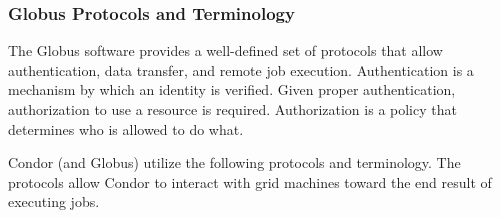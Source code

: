 \subsubsection{\label{sec:Globus-Protocols}Globus Protocols and Terminology}
The Globus software provides a well-defined set of protocols
that allow authentication, data transfer, and remote job execution.
Authentication is a mechanism by which an identity is verified.
Given proper authentication, authorization to use a resource
is required.
Authorization is a policy that determines who is allowed to do what. 

Condor (and Globus) utilize the following protocols and terminology.
The protocols allow Condor to interact with grid machines toward
the end result of executing jobs.
